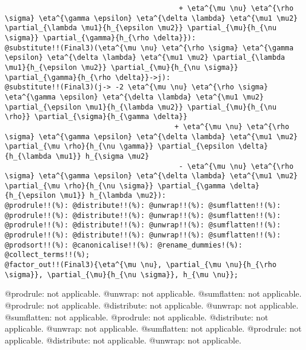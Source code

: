 \documentclass[11pt]{article}
\begin{document}
{\begin{verbatim}
                                         + \eta^{\mu \nu} \eta^{\rho \sigma} \eta^{\gamma \epsilon} \eta^{\delta \lambda} \eta^{\mu1 \mu2} \partial_{\lambda \mu1}{h_{\epsilon \mu2}} \partial_{\mu}{h_{\nu \sigma}} \partial_{\gamma}{h_{\rho \delta}}):
@substitute!!(Final3)(\eta^{\mu \nu} \eta^{\rho \sigma} \eta^{\gamma \epsilon} \eta^{\delta \lambda} \eta^{\mu1 \mu2} \partial_{\lambda \mu1}{h_{\epsilon \mu2}} \partial_{\mu}{h_{\nu \sigma}} \partial_{\gamma}{h_{\rho \delta}}->j):
@substitute!!(Final3)(j-> -2 \eta^{\mu \nu} \eta^{\rho \sigma} \eta^{\gamma \epsilon} \eta^{\delta \lambda} \eta^{\mu1 \mu2} \partial_{\epsilon \mu1}{h_{\lambda \mu2}} \partial_{\mu}{h_{\nu \rho}} \partial_{\sigma}{h_{\gamma \delta}} 
                                        + \eta^{\mu \nu} \eta^{\rho \sigma} \eta^{\gamma \epsilon} \eta^{\delta \lambda} \eta^{\mu1 \mu2} \partial_{\mu \rho}{h_{\nu \gamma}} \partial_{\epsilon \delta}{h_{\lambda \mu1}} h_{\sigma \mu2}
                                         - \eta^{\mu \nu} \eta^{\rho \sigma} \eta^{\gamma \epsilon} \eta^{\delta \lambda} \eta^{\mu1 \mu2} \partial_{\mu \rho}{h_{\nu \sigma}} \partial_{\gamma \delta}{h_{\epsilon \mu1}} h_{\lambda \mu2}):
@prodrule!!(%): @distribute!!(%): @unwrap!!(%): @sumflatten!!(%):
@prodrule!!(%): @distribute!!(%): @unwrap!!(%): @sumflatten!!(%):
@prodrule!!(%): @distribute!!(%): @unwrap!!(%): @sumflatten!!(%):
@prodrule!!(%): @distribute!!(%): @unwrap!!(%): @sumflatten!!(%):
@prodsort!!(%): @canonicalise!!(%): @rename_dummies!(%): @collect_terms!!(%);
@factor_out!!(Final3){\eta^{\mu \nu}, \partial_{\mu \nu}{h_{\rho \sigma}}, \partial_{\mu}{h_{\nu \sigma}}, h_{\mu \nu}};
\end{verbatim}}
@prodrule: not applicable.
@unwrap: not applicable.
@sumflatten: not applicable.
@prodrule: not applicable.
@distribute: not applicable.
@unwrap: not applicable.
@sumflatten: not applicable.
@prodrule: not applicable.
@distribute: not applicable.
@unwrap: not applicable.
@sumflatten: not applicable.
@prodrule: not applicable.
@distribute: not applicable.
@unwrap: not applicable.
\end{document}
